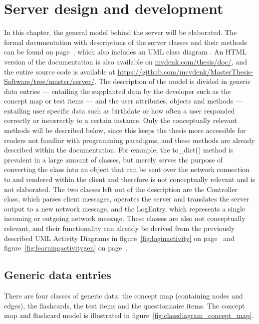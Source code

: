 \chapter{Server design and development}
\label{ch:server}

In this chapter, the general model behind the server will be elaborated. The formal documentation with descriptions of the server classes and their methods can be found on page~\pageref{app:documentation}, which also includes an UML class diagram \cite{uml}. An HTML version of the documentation is also available on \url{mvdenk.com/thesis/doc/}, and the entire source code is available at \url{https://github.com/mcvdenk/MasterThesis-Software/tree/master/server/}. The description of the model is divided in generic data entries --- entailing the supplanted data by the developer such as the concept map or test items --- and the user attributes, objects and methods --- entailing user specific data such as birthdate or how often a user responded correctly or incorrectly to a certain instance. Only the conceptually relevant methods will be described below, since this keeps the thesis more accessible for readers not familiar with programming paradigms, and these methods are already described within the documentation. For example, the to\_dict() method is prevalent in a large amount of classes, but merely serves the purpose of converting the class into an object that can be sent over the network connection to and rendered within the client and therefore is not conceptually relevant and is not elaborated. The two classes left out of the description are the Controller class, which parses client messages, operates the server and translates the server output to a new network message, and the LogEntry, which represents a single incoming or outgoing network message. These classes are also not conceptually relevant, and their functionality can already be derived from the previously described UML Activity Diagrams in figure~\ref{fig:loginactivity} on page~\pageref{fig:loginactivity} and figure~\ref{fig:learningactivitygen} on page~\pageref{fig:learningactivitygen}.

\section{Generic data entries}

There are four classes of generic data: the concept map (containing nodes and edges), the flashcards, the test items and the questionnaire items. The concept map and flashcard model is illustrated in figure~\ref{fig:classdiagram_concept_map}.

